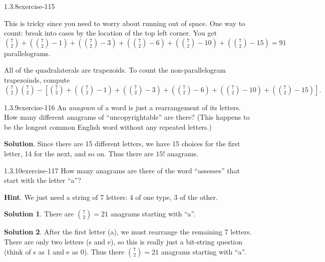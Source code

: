 \documentclass[twoside,11pt,]{book}
\numberwithin{equation}{chapter}
\begin{document}
\begin{divisionsolution}{1.3.8}{}{exercise-115}
\par
\hypertarget{p-1921}{}%
This is tricky since you need to worry about running out of space. One way to count: break into cases by the location of the top left corner. You get \({7 \choose 2} + ({7 \choose 2}-1) + ({7 \choose 2} - 3) + ({7 \choose 2} - 6) + ({7 \choose 2} - 10) + ({7 \choose 2} - 15) = 91\) parallelograms.%
\par
\hypertarget{p-1922}{}%
All of the quadralaterals are trapezoids. To count the non-parallelogram trapezoinds, compute \({7\choose 2}{7\choose 2} - \left[ {7 \choose 2} + ({7 \choose 2}-1) + ({7 \choose 2} - 3) + ({7 \choose 2} - 6) + ({7 \choose 2} - 10) + ({7 \choose 2} - 15) \right]\text{.}\)%
\end{divisionsolution}%
\begin{divisionsolution}{1.3.9}{}{exercise-116}%
\hypertarget{p-1926}{}%
An \emph{anagram} of a word is just a rearrangement of its letters. How many different anagrams of ``uncopyrightable'' are there? (This happens to be the longest common English word without any repeated letters.)%
\par\smallskip%
\noindent\textbf{Solution}.\quad%
\hypertarget{p-1928}{}%
Since there are 15 different letters, we have 15 choices for the first letter, 14 for the next, and so on. Thus there are \(15!\) anagrams.%
\end{divisionsolution}%
\begin{divisionsolution}{1.3.10}{}{exercise-117}%
\hypertarget{p-1934}{}%
How many anagrams are there of the word ``assesses'' that start with the letter ``a''?%
\par\smallskip%
\noindent\textbf{Hint}.\quad%
\hypertarget{p-1936}{}%
We just need a string of 7 letters: 4 of one type, 3 of the other.%
\par\smallskip%
\noindent\textbf{Solution 1}.\quad%
\hypertarget{p-1937}{}%
There are \({7 \choose 2} = 21\) anagrams starting with ``a''.%
\par\smallskip%
\noindent\textbf{Solution 2}.\quad%
\hypertarget{p-1938}{}%
After the first letter (a), we must rearrange the remaining 7 letters. There are only two letters (s and e), so this is really just a bit-string question (think of s as 1 and e as 0). Thus there \({7 \choose 2} = 21\) anagrams starting with ``a''.%
\end{divisionsolution}%
\end{document}
